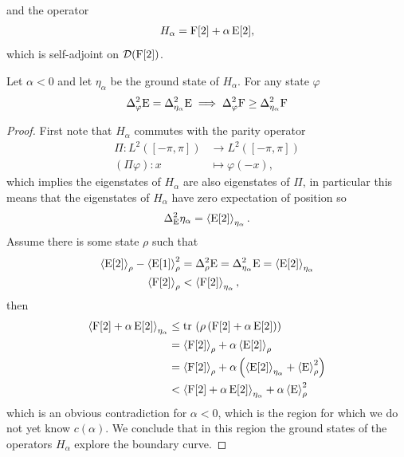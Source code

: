and the operator
\begin{align}
  H_\alpha = \operatorname{F}[2] + \alpha\operatorname{E}[2],
\end{align}
which is self-adjoint on $\mathcal{D}(\operatorname{F}[2])$.
\begin{lem}
  Let $\alpha < 0$ and let $\eta_\alpha$ be the ground state of $H_\alpha$. For any state $\varphi$
  \begin{align}
    \var[\varphi]{\ope} = \var[\eta_\alpha]{\ope} \implies \var[\varphi]{\opf} \geq \var[\eta_\alpha]{\opf}
  \end{align}
\end{lem}
\begin{proof}
First note that $H_\alpha$ commutes with the parity operator 
\begin{align}
  \Pi: L^2([-\pi,\pi]) &\to L^2([-\pi,\pi])\\
  (\Pi \varphi):x &\mapsto \varphi(-x),
\end{align}
which implies the eigenstates of $H_\alpha$ are also eigenstates of $\Pi$, in particular this means that the eigenstates of $H_\alpha$ have zero expectation of position so
\begin{align}
  \var[\ope]{\eta_\alpha} = \expe{\ope[2]}{\eta_\alpha}.
\end{align}
Assume there is some state $\rho$ such that
\begin{align}
	\expe{\ope[2]}{\rho} - \expe{\ope[1]}{\rho}^2 &= \var[\rho]{\ope} = \var[\eta_\alpha]{\ope} = \expe{\ope[2]}{\eta_\alpha}\\
	\expe{\opf[2]}{\rho} &< \expe{\opf[2]}{\eta_\alpha},
\end{align}
then
\begin{align}
	\expe{\opf[2] +\alpha\ope[2]}{\eta_\alpha} &\leq \tr{\rho\left(\opf[2] +\alpha\ope[2]\right)}\\
	&= \expe{\opf[2]}{\rho} + \alpha\expe{\ope[2]}{\rho}\\
	&= \expe{\opf[2]}{\rho} + \alpha\left(\expe{\ope[2]}{\eta_\alpha} + \expe{\ope}{\rho}^2\right)\\
	&< \expe{\opf[2] + \alpha\ope[2]}{\eta_\alpha} + \alpha\expe{\ope}{\rho}^2
\end{align}
which is an obvious contradiction for $\alpha < 0$, which is the region for which we do not yet know $c(\alpha)$. We conclude that in this region the ground states of the operators $H_\alpha$ explore the boundary curve.
\end{proof}

